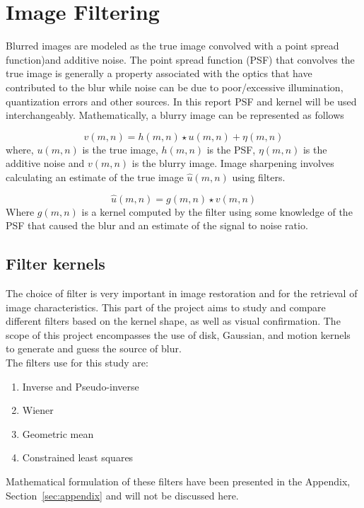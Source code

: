 \graphicspath{{mehul_pics/}}%

\section{Image Filtering}

Blurred images are modeled as the true image convolved with a point spread function)and additive noise. The point spread function (PSF) that convolves the true image is generally a property associated with the optics that have contributed to the blur while noise can be due to poor/excessive illumination, quantization errors and other sources. In this report PSF and kernel will be used interchangeably. Mathematically, a blurry image can be represented as follows

\begin{equation}
v(m,n)= h(m,n) \star u(m,n) + \eta(m,n)
\end{equation}
where, $u(m,n)$ is the true image, $h(m,n)$ is the PSF, $\eta(m,n)$ is the additive noise and $v(m,n)$ is the blurry image. Image sharpening involves calculating an estimate of the true image $\hat{u}(m,n)$ using filters.

\begin{equation}
\hat{u}(m,n)= g(m,n) \star v(m,n)
\end{equation}
Where $g(m,n)$ is a kernel computed by the filter using some knowledge of the PSF that caused the blur and an estimate of the signal to noise ratio.

\subsection{Filter kernels}
The choice of filter is very important in image restoration and for the retrieval of image characteristics. This part of the project aims to study and compare different filters based on the kernel shape, as well as visual confirmation. The scope of this project encompasses the use of disk, Gaussian, and motion kernels to generate and guess the source of blur.\\

The filters use for this study are: 
\begin{enumerate}
\item Inverse and Pseudo-inverse
\item Wiener
\item Geometric mean
\item Constrained least squares
\end{enumerate} 
Mathematical formulation of these filters have been presented in the Appendix, Section~\ref{sec:appendix} and will not be discussed here. 
